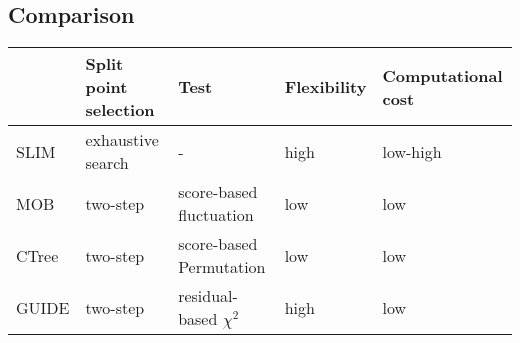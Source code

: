 \subsection{Comparison}
\begin{table}[ht]
\centering
\begin{tabular}{lllll}
  \hline
 & Split point selection & Test & Flexibility & Computational cost  \\ 
  \hline
    SLIM & exhaustive search & - & high & low-high  \\ 
    MOB & two-step & score-based fluctuation & low & low  \\ 
    CTree & two-step & score-based Permutation & low & low  \\ 
    GUIDE & two-step & residual-based $\chi^2$  & high & low  \\ 
   \hline
\end{tabular}
\end{table}
\citep{Schlosser.2019}


